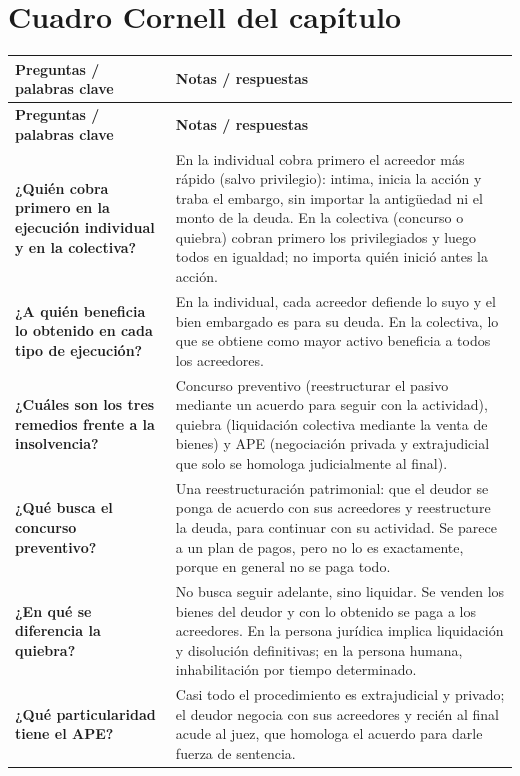 \documentclass[12pt,oneside]{book}
\newcommand{\cornellrow}[2]{\textbf{#1} & #2 \\ \midrule}
\begin{document}
\section{Cuadro Cornell del capítulo}

{\RaggedRight
\begin{longtable}{
    >{\RaggedRight\arraybackslash}p{}
    >{\RaggedRight\arraybackslash}p{}
}
\toprule
\textbf{Preguntas / palabras clave} & \textbf{Notas / respuestas} \\
\midrule
\endfirsthead
\toprule
\textbf{Preguntas / palabras clave} & \textbf{Notas / respuestas} \\
\midrule
\endhead

\cornellrow{¿Quién cobra primero en la ejecución individual y en la colectiva?}{En la individual cobra primero el acreedor más rápido (salvo privilegio): intima, inicia la acción y traba el embargo, sin importar la antigüedad ni el monto de la deuda. En la colectiva (concurso o quiebra) cobran primero los privilegiados y luego todos en igualdad; no importa quién inició antes la acción.}

\cornellrow{¿A quién beneficia lo obtenido en cada tipo de ejecución?}{En la individual, cada acreedor defiende lo suyo y el bien embargado es para su deuda. En la colectiva, lo que se obtiene como mayor activo beneficia a todos los acreedores.}

\cornellrow{¿Cuáles son los tres remedios frente a la insolvencia?}{Concurso preventivo (reestructurar el pasivo mediante un acuerdo para seguir con la actividad), quiebra (liquidación colectiva mediante la venta de bienes) y APE (negociación privada y extrajudicial que solo se homologa judicialmente al final).}

\cornellrow{¿Qué busca el concurso preventivo?}{Una reestructuración patrimonial: que el deudor se ponga de acuerdo con sus acreedores y reestructure la deuda, para continuar con su actividad. Se parece a un plan de pagos, pero no lo es exactamente, porque en general no se paga todo.}

\cornellrow{¿En qué se diferencia la quiebra?}{No busca seguir adelante, sino liquidar. Se venden los bienes del deudor y con lo obtenido se paga a los acreedores. En la persona jurídica implica liquidación y disolución definitivas; en la persona humana, inhabilitación por tiempo determinado.}

\cornellrow{¿Qué particularidad tiene el APE?}{Casi todo el procedimiento es extrajudicial y privado; el deudor negocia con sus acreedores y recién al final acude al juez, que homologa el acuerdo para darle fuerza de sentencia.}


\end{longtable}}
\end{document}
